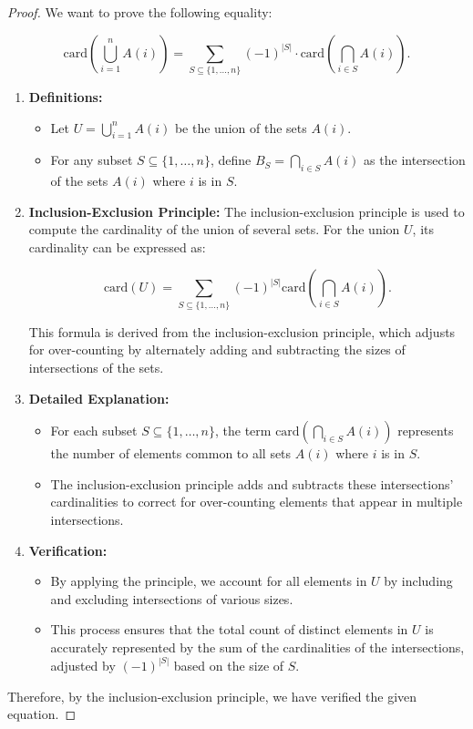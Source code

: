 \begin{proof}
  \leanok
  We want to prove the following equality:

  \[
  \text{card} \left( \bigcup_{i=1}^n A(i) \right) = \sum_{S \subseteq \{1, \ldots, n\}} (-1)^{|S|} \cdot \text{card} \left( \bigcap_{i \in S} A(i) \right).
  \]
  
  \begin{enumerate}
    \item \textbf{Definitions:}
    \begin{itemize}
        \item Let \( U = \bigcup_{i=1}^n A(i) \) be the union of the sets \( A(i) \).
        \item For any subset \( S \subseteq \{1, \ldots, n\} \), define \( B_S = \bigcap_{i \in S} A(i) \) as the intersection of the sets \( A(i) \) where \( i \) is in \( S \).
    \end{itemize}

    \item \textbf{Inclusion-Exclusion Principle:}
    The inclusion-exclusion principle is used to compute the cardinality of the union of several sets. For the union \( U \), its cardinality can be expressed as:

    \[
    \text{card}(U) = \sum_{S \subseteq \{1, \ldots, n\}} (-1)^{|S|} \text{card} \left( \bigcap_{i \in S} A(i) \right).
    \]

    This formula is derived from the inclusion-exclusion principle, which adjusts for over-counting by alternately adding and subtracting the sizes of intersections of the sets.

    \item \textbf{Detailed Explanation:}
    \begin{itemize}
        \item For each subset \( S \subseteq \{1, \ldots, n\} \), the term \( \text{card} \left( \bigcap_{i \in S} A(i) \right) \) represents the number of elements common to all sets \( A(i) \) where \( i \) is in \( S \).
        \item The inclusion-exclusion principle adds and subtracts these intersections' cardinalities to correct for over-counting elements that appear in multiple intersections.
    \end{itemize}

    \item \textbf{Verification:}
    \begin{itemize}
        \item By applying the principle, we account for all elements in \( U \) by including and excluding intersections of various sizes.
        \item This process ensures that the total count of distinct elements in \( U \) is accurately represented by the sum of the cardinalities of the intersections, adjusted by \( (-1)^{|S|} \) based on the size of \( S \).
    \end{itemize}
\end{enumerate}

Therefore, by the inclusion-exclusion principle, we have verified the given equation.
\end{proof}